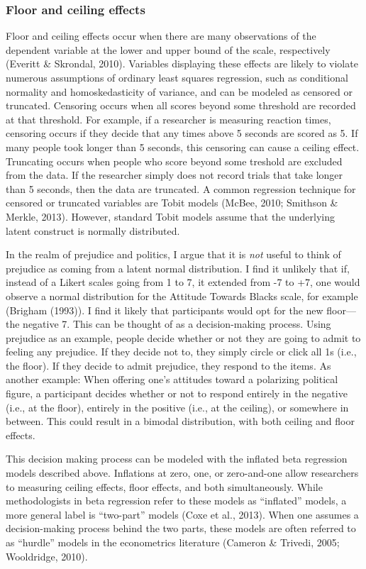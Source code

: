 \documentclass[english,man]{apa6}
\theoremstyle{definition}
\theoremstyle{definition}
\theoremstyle{remark}
\begin{document}
\subsubsection{Floor and ceiling
effects}\label{floor-and-ceiling-effects}

Floor and ceiling effects occur when there are many observations of the
dependent variable at the lower and upper bound of the scale,
respectively (Everitt \& Skrondal, 2010). Variables displaying these
effects are likely to violate numerous assumptions of ordinary least
squares regression, such as conditional normality and homoskedasticity
of variance, and can be modeled as censored or truncated. Censoring
occurs when all scores beyond some threshold are recorded at that
threshold. For example, if a researcher is measuring reaction times,
censoring occurs if they decide that any times above 5 seconds are
scored as 5. If many people took longer than 5 seconds, this censoring
can cause a ceiling effect. Truncating occurs when people who score
beyond some treshold are excluded from the data. If the researcher
simply does not record trials that take longer than 5 seconds, then the
data are truncated. A common regression technique for censored or
truncated variables are Tobit models (McBee, 2010; Smithson \& Merkle,
2013). However, standard Tobit models assume that the underlying latent
construct is normally distributed.

In the realm of prejudice and politics, I argue that it is \emph{not}
useful to think of prejudice as coming from a latent normal
distribution. I find it unlikely that if, instead of a Likert scales
going from 1 to 7, it extended from -7 to +7, one would observe a normal
distribution for the Attitude Towards Blacks scale, for example (Brigham
(1993)). I find it likely that participants would opt for the new
floor---the negative 7. This can be thought of as a decision-making
process. Using prejudice as an example, people decide whether or not
they are going to admit to feeling any prejudice. If they decide not to,
they simply circle or click all 1s (i.e., the floor). If they decide to
admit prejudice, they respond to the items. As another example: When
offering one's attitudes toward a polarizing political figure, a
participant decides whether or not to respond entirely in the negative
(i.e., at the floor), entirely in the positive (i.e., at the ceiling),
or somewhere in between. This could result in a bimodal distribution,
with both ceiling and floor effects.

This decision making process can be modeled with the inflated beta
regression models described above. Inflations at zero, one, or
zero-and-one allow researchers to measuring ceiling effects, floor
effects, and both simultaneously. While methodologists in beta
regression refer to these models as \enquote{inflated} models, a more
general label is \enquote{two-part} models (Coxe et al., 2013). When one
assumes a decision-making process behind the two parts, these models are
often referred to as \enquote{hurdle} models in the econometrics
literature (Cameron \& Trivedi, 2005; Wooldridge, 2010).
\end{document}
